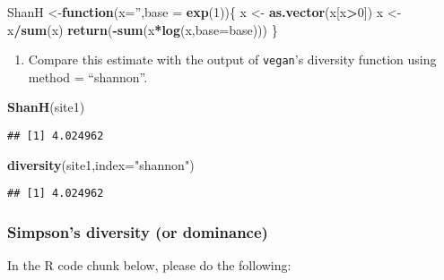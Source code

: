 \documentclass[
]{article}
\newenvironment{Shaded}{\begin{snugshade}}{\end{snugshade}}
\newcommand{\ControlFlowTok}[1]{\textcolor[rgb]{0.13,0.29,0.53}{\textbf{#1}}}
\newcommand{\DataTypeTok}[1]{\textcolor[rgb]{0.13,0.29,0.53}{#1}}
\newcommand{\DecValTok}[1]{\textcolor[rgb]{0.00,0.00,0.81}{#1}}
\newcommand{\KeywordTok}[1]{\textcolor[rgb]{0.13,0.29,0.53}{\textbf{#1}}}
\newcommand{\NormalTok}[1]{#1}
\newcommand{\OperatorTok}[1]{\textcolor[rgb]{0.81,0.36,0.00}{\textbf{#1}}}
\newcommand{\StringTok}[1]{\textcolor[rgb]{0.31,0.60,0.02}{#1}}
\providecommand{\tightlist}{%
  \setlength{\itemsep}{0pt}\setlength{\parskip}{0pt}}
\begin{document}
\begin{Shaded}
\begin{Highlighting}[]
\NormalTok{ShanH <-}\ControlFlowTok{function}\NormalTok{(}\DataTypeTok{x=}\StringTok{''}\NormalTok{,}\DataTypeTok{base =} \KeywordTok{exp}\NormalTok{(}\DecValTok{1}\NormalTok{))\{}
\NormalTok{  x <-}\StringTok{ }\KeywordTok{as.vector}\NormalTok{(x[x}\OperatorTok{>}\DecValTok{0}\NormalTok{])}
\NormalTok{  x <-}\StringTok{ }\NormalTok{x}\OperatorTok{/}\KeywordTok{sum}\NormalTok{(x)}
  \KeywordTok{return}\NormalTok{(}\OperatorTok{-}\KeywordTok{sum}\NormalTok{(x}\OperatorTok{*}\KeywordTok{log}\NormalTok{(x,}\DataTypeTok{base=}\NormalTok{base)))}
\NormalTok{\}}
\end{Highlighting}
\end{Shaded}

\begin{enumerate}
\def\labelenumi{\arabic{enumi}.}
\setcounter{enumi}{1}
\tightlist
\item
  Compare this estimate with the output of \texttt{vegan}'s diversity
  function using method = ``shannon''.
\end{enumerate}

\begin{Shaded}
\begin{Highlighting}[]
\KeywordTok{ShanH}\NormalTok{(site1)}
\end{Highlighting}
\end{Shaded}

\begin{verbatim}
## [1] 4.024962
\end{verbatim}

\begin{Shaded}
\begin{Highlighting}[]
\KeywordTok{diversity}\NormalTok{(site1,}\DataTypeTok{index=}\StringTok{"shannon"}\NormalTok{)}
\end{Highlighting}
\end{Shaded}

\begin{verbatim}
## [1] 4.024962
\end{verbatim}

\hypertarget{simpsons-diversity-or-dominance}{%
\subsubsection{Simpson's diversity (or
dominance)}\label{simpsons-diversity-or-dominance}}

In the R code chunk below, please do the following:
\end{document}
